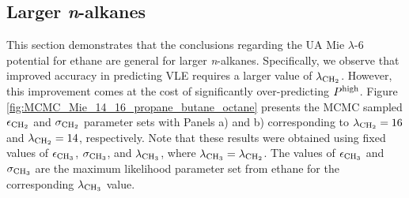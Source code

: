 \documentclass[journal=jctc,manuscript=article]{achemso}
\begin{document}

\subsection{Larger \textit{n}-alkanes} \label{Larger_nalkanes}


This section demonstrates that the conclusions regarding the UA Mie $\lambda$-6 potential for ethane are general for larger \textit{n}-alkanes. Specifically, we observe that improved accuracy in predicting VLE requires a larger value of $\lambda_{\rm CH_2}$. However, this improvement comes at the cost of significantly over-predicting $P^{\rm high}$. Figure \ref{fig:MCMC_Mie_14_16_propane_butane_octane} presents the MCMC sampled $\epsilon_{\rm CH_2}$ and $\sigma_{\rm CH_2}$ parameter sets with Panels a) and b) corresponding to $\lambda_{\rm CH_2} = 16$ and $\lambda_{\rm CH_2} = 14$, respectively. Note that these results were obtained using fixed values of $\epsilon_{\rm CH_3}$, $\sigma_{\rm CH_3}$, and $\lambda_{\rm CH_3}$, where $\lambda_{\rm CH_3} = \lambda_{\rm CH_2}$. The values of $\epsilon_{\rm CH_3}$ and $\sigma_{\rm CH_3}$ are the maximum likelihood parameter set from ethane for the corresponding $\lambda_{\rm CH_3}$ value.
\end{document}
